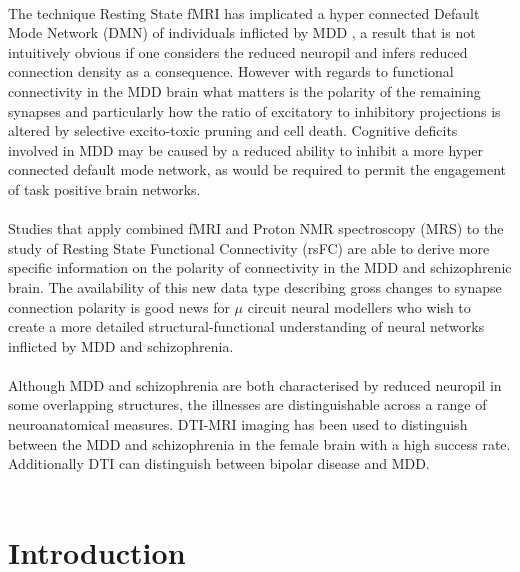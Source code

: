 \documentclass[a4paper,11pt]{article}
\begin{document}
\\
The technique Resting State fMRI has implicated a hyper connected Default Mode Network (DMN) of individuals inflicted by MDD \cite{horn2010glutamatergic}\cite{liston2014default}, a result that is not intuitively obvious if one considers the reduced neuropil and infers reduced connection density as a consequence. However with regards to functional connectivity in the MDD brain what matters is the polarity of the remaining synapses and particularly how the ratio of excitatory to inhibitory projections is altered by selective excito-toxic pruning and cell death. Cognitive deficits involved in MDD may be caused by a reduced ability to inhibit a more hyper connected default mode network, as would be required to permit the engagement of task positive brain networks.\\ %
\\
Studies that apply combined fMRI and Proton NMR spectroscopy (MRS) to the study of Resting State Functional Connectivity (rsFC) are able to derive more specific information on the polarity of connectivity in the MDD and schizophrenic brain\cite{horn2010glutamatergic}. The availability of this new data type describing gross changes to synapse connection polarity is good news for $\mu$ circuit neural modellers who wish to create a more detailed structural-functional understanding of neural networks inflicted by MDD and schizophrenia.\\ 
\\
Although MDD and schizophrenia are both characterised by reduced neuropil in some overlapping structures, the illnesses are distinguishable across a range of neuroanatomical measures. DTI-MRI imaging has been used to distinguish between the MDD and schizophrenia in the female brain with a high success rate. Additionally DTI can distinguish between bipolar disease and MDD\cite{ota2013discrimination}.\\ %
\\
\section{Introduction}
\end{document}
